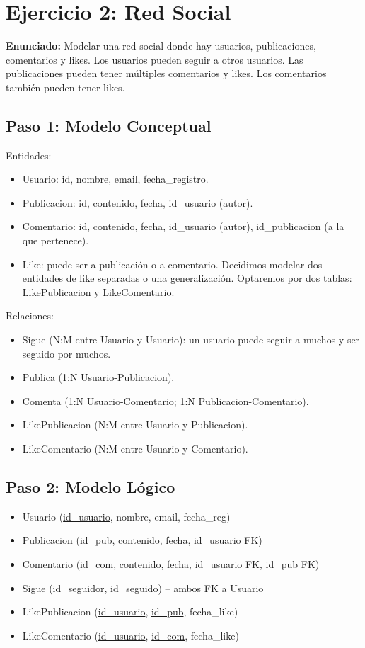 \documentclass[12pt,a4paper,openany,oneside]{book}
\begin{document}
\section{Ejercicio 2: Red Social}
\textbf{Enunciado:} Modelar una red social donde hay usuarios, publicaciones, comentarios y likes. Los usuarios pueden seguir a otros usuarios. Las publicaciones pueden tener múltiples comentarios y likes. Los comentarios también pueden tener likes.

\subsection{Paso 1: Modelo Conceptual}
Entidades:
\begin{itemize}
    \item Usuario: id, nombre, email, fecha\_registro.
    \item Publicacion: id, contenido, fecha, id\_usuario (autor).
    \item Comentario: id, contenido, fecha, id\_usuario (autor), id\_publicacion (a la que pertenece).
    \item Like: puede ser a publicación o a comentario. Decidimos modelar dos entidades de like separadas o una generalización. Optaremos por dos tablas: LikePublicacion y LikeComentario.
\end{itemize}
Relaciones:
\begin{itemize}
    \item Sigue (N:M entre Usuario y Usuario): un usuario puede seguir a muchos y ser seguido por muchos.
    \item Publica (1:N Usuario-Publicacion).
    \item Comenta (1:N Usuario-Comentario; 1:N Publicacion-Comentario).
    \item LikePublicacion (N:M entre Usuario y Publicacion).
    \item LikeComentario (N:M entre Usuario y Comentario).
\end{itemize}

\subsection{Paso 2: Modelo Lógico}
\begin{itemize}
    \item Usuario (\underline{id\_usuario}, nombre, email, fecha\_reg)
    \item Publicacion (\underline{id\_pub}, contenido, fecha, id\_usuario FK)
    \item Comentario (\underline{id\_com}, contenido, fecha, id\_usuario FK, id\_pub FK)
    \item Sigue (\underline{id\_seguidor}, \underline{id\_seguido}) -- ambos FK a Usuario
    \item LikePublicacion (\underline{id\_usuario}, \underline{id\_pub}, fecha\_like)
    \item LikeComentario (\underline{id\_usuario}, \underline{id\_com}, fecha\_like)
\end{itemize}
\end{document}
